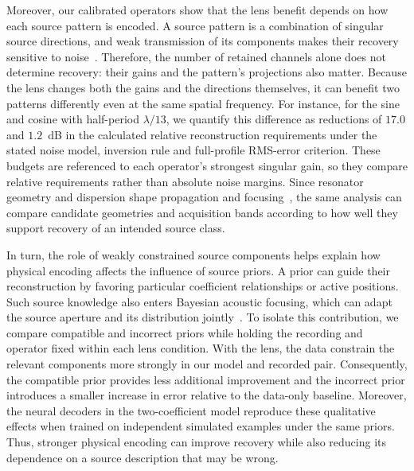 \documentclass[lineno,pdflatex,sn-nature]{sn-jnl}%
\theoremstyle{thmstyleone}%
\theoremstyle{thmstyletwo}%
\theoremstyle{thmstylethree}%
\begin{document}
Moreover, our calibrated operators show that the lens benefit depends on how each source pattern is encoded. A source pattern is a combination of singular source directions, and weak transmission of its components makes their recovery sensitive to noise~\cite{kim2003}. Therefore, the number of retained channels alone does not determine recovery: their gains and the pattern's projections also matter. Because the lens changes both the gains and the directions themselves, it can benefit two patterns differently even at the same spatial frequency. For instance, for the sine and cosine with half-period $\lambda/13$, we quantify this difference as reductions of $17.0$ and $1.2$~dB in the calculated relative reconstruction requirements under the stated noise model, inversion rule and full-profile RMS-error criterion. These budgets are referenced to each operator's strongest singular gain, so they compare relative requirements rather than absolute noise margins. Since resonator geometry and dispersion shape propagation and focusing~\cite{lanoy2021,kingsley2022}, the same analysis can compare candidate geometries and acquisition bands according to how well they support recovery of an intended source class.

In turn, the role of weakly constrained source components helps explain how physical encoding affects the influence of source priors. A prior can guide their reconstruction by favoring particular coefficient relationships or active positions. Such source knowledge also enters Bayesian acoustic focusing, which can adapt the source aperture and its distribution jointly~\cite{antoni2019}. To isolate this contribution, we compare compatible and incorrect priors while holding the recording and operator fixed within each lens condition. With the lens, the data constrain the relevant components more strongly in our model and recorded pair. Consequently, the compatible prior provides less additional improvement and the incorrect prior introduces a smaller increase in error relative to the data-only baseline. Moreover, the neural decoders in the two-coefficient model reproduce these qualitative effects when trained on independent simulated examples under the same priors. Thus, stronger physical encoding can improve recovery while also reducing its dependence on a source description that may be wrong.
\end{document}
